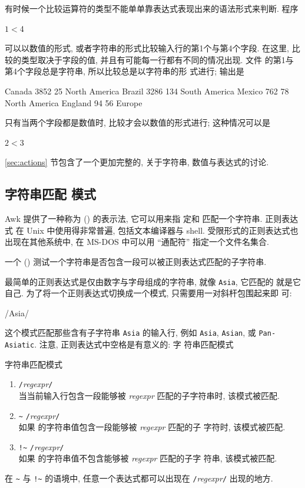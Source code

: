 有时候一个比较运算符的类型不能单单靠表达式表现出来的语法形式来判断. 程序
\begin{awkcode}
    $1 < $4
\end{awkcode}
可以以数值的形式, 或者字符串的形式比较输入行的第1个与第4个字段. 在这里,
比较的类型取决于字段的值, 并且有可能每一行都有不同的情况出现. 文件
 的第1与第4个字段总是字符串, 所以比较总是以字符串的形
式进行; 输出是
\begin{file}
    Canada	3852	25	North America
    Brazil	3286	134	South America
    Mexico	762	78	North America
    England	94	56	Europe
\end{file}
只有当两个字段都是数值时, 比较才会以数值的形式进行; 这种情况可以是
\begin{awkcode}
    $2 < $3
\end{awkcode}

\ref{sec:actions} 节包含了一个更加完整的, 关于字符串, 数值与表达式的讨论.

\subsection{字符串匹配 模式}
\label{subsec:string_matching_pattern}

Awk 提供了一种称为  (\regexpr) 的表示法, 它可以用来指
定和
匹配一个字符串.  正则表达式 在 Unix 中使用得非常普遍, 包括文本编译器与
shell. 受限形式的正则表达式也出现在其他系统中, 在 MS-DOS 中可以用
``通配符'' 指定一个文件名集合.

一个  ()
测试一个字符串是否包含一段可以被正则表达式匹配的子字符串.

最简单的正则表达式是仅由数字与字母组成的字符串, 就像 \verb'Asia', 它匹配的
就是它自己. 为了将一个正则表达式切换成一个模式, 只需要用一对斜杆包围起来即
可:
\begin{awkcode}
    /Asia/
\end{awkcode}
这个模式匹配那些含有子字符串 \verb'Asia' 的输入行, 例如 \verb'Asia',
\verb'Asian', 或 \verb'Pan-Asiatic'. 注意, 正则表达式中空格是有意义的: 字
符串匹配模式
\begin{summary}{字符串匹配模式}
    \begin{enumerate}
        \item \verb'/'\textit{regexpr}\verb'/' \\
            当当前输入行包含一段能够被 \textit{regexpr} 匹配的子字符串时,
            该模式被匹配.
        \item \regexpr {} \verb'~' \verb'/'\textit{regexpr}\verb'/' \\
            如果 \expr 的字符串值包含一段能够被 \textit{regexpr} 匹配的子
            字符时, 该模式被匹配.
        \item \expr {} \verb'!~' \verb'/'\textit{regexpr}\verb'/' \\
            如果 \expr 的字符串值不包含能够被 \textit{regexpr} 匹配的子字
            符串, 该模式被匹配.
    \end{enumerate}
    在 \verb'~' 与 \verb'!~' 的语境中, 任意一个表达式都可以出现在
    \verb'/'\textit{regexpr}\verb'/' 出现的地方.
\end{summary}

